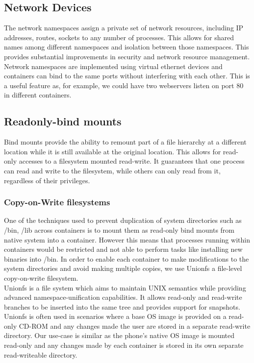 \subsection{Network Devices}
The network namespaces assign a private set of network resources, including IP addresses, routes, sockets to any number of processes.  This allows for shared names among different namespaces and isolation between those namespaces.  This provides substantial improvements in security and network resource management. Network namespaces are implemented using virtual ethernet devices and containers can bind to the same ports without interfering with each other. This is a useful feature as, for example, we could have two webservers listen on port $80$ in different containers.


\subsection{Readonly-bind mounts}
Bind mounts provide the ability to remount part of a file hierarchy at a different location while it is still available at the original location.  This allows for read-only accesses to a filesystem mounted read-write.  It guarantees that one process can read and write to the filesystem, while others can only read from it, regardless of their privileges.

\subsubsection{Copy-on-Write filesystems}
One of the techniques used to prevent duplication of system directories such as /bin, /lib across containers is to mount them as read-only bind mounts from native system into a container. However this means that processes running within containers would be restricted and not able to perform tasks like installing new binaries into /bin. In order to enable each container to make modifications to the system directories and avoid making multiple copies, we use Unionfs \cite{tos06unionfs} a file-level copy-on-write filesystem.\\ 

Unionfs is a file system which aims to maintain UNIX semantics while providing advanced namespace-unification capabilities. It allows read-only and read-write branches to be inserted into the same tree and provides support for snapshots. Unionfs is often used in scenarios where a base OS image is provided on a read-only CD-ROM and any changes made the user are stored in a separate read-write directory. Our use-case is similar as the phone's native OS image is mounted read-only and any changes made by each container is stored in its own separate read-writeable directory.

